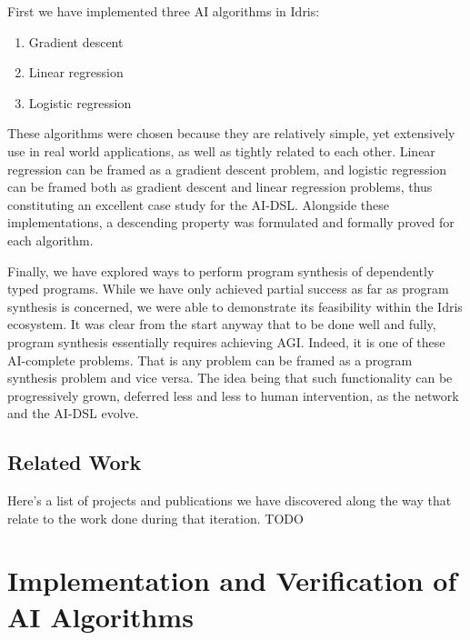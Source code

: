 \documentclass[]{report}
\begin{document}
First we have implemented three AI algorithms in Idris:
\begin{enumerate}
\item Gradient descent
\item Linear regression
\item Logistic regression
\end{enumerate}
These algorithms were chosen because they are relatively simple, yet
extensively use in real world applications, as well as tightly related
to each other.  Linear regression can be framed as a gradient descent
problem, and logistic regression can be framed both as gradient
descent and linear regression problems, thus constituting an excellent
case study for the AI-DSL.  Alongside these implementations, a
descending property was formulated and formally proved for each
algorithm.

Finally, we have explored ways to perform program synthesis of
dependently typed programs.  While we have only achieved partial
success as far as program synthesis is concerned, we were able to
demonstrate its feasibility within the Idris ecosystem.  It was clear
from the start anyway that to be done well and fully, program
synthesis essentially requires achieving AGI.  Indeed, it is one of
these AI-complete problems.  That is any problem can be framed as a
program synthesis problem and vice versa.  The idea being that such
functionality can be progressively grown, deferred less and less to
human intervention, as the network and the AI-DSL evolve.

\section{Related Work}

Here's a list of projects and publications we have discovered along
the way that relate to the work done during that iteration.  TODO

\chapter{Implementation and Verification of AI Algorithms}
\end{document}
